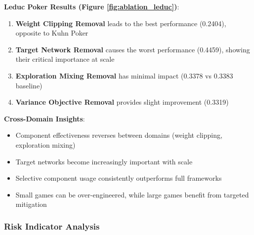 \documentclass[12pt,a4paper]{article}
\begin{document}
\textbf{Leduc Poker Results (Figure \ref{fig:ablation_leduc})}:
\begin{enumerate}
\item \textbf{Weight Clipping Removal} leads to the best performance (0.2404), opposite to Kuhn Poker
\item \textbf{Target Network Removal} causes the worst performance (0.4459), showing their critical importance at scale
\item \textbf{Exploration Mixing Removal} has minimal impact (0.3378 vs 0.3383 baseline)
\item \textbf{Variance Objective Removal} provides slight improvement (0.3319)
\end{enumerate}

\textbf{Cross-Domain Insights}:
\begin{itemize}
\item Component effectiveness reverses between domains (weight clipping, exploration mixing)
\item Target networks become increasingly important with scale
\item Selective component usage consistently outperforms full frameworks
\item Small games can be over-engineered, while large games benefit from targeted mitigation
\end{itemize}

\subsubsection{Risk Indicator Analysis}
\end{document}
